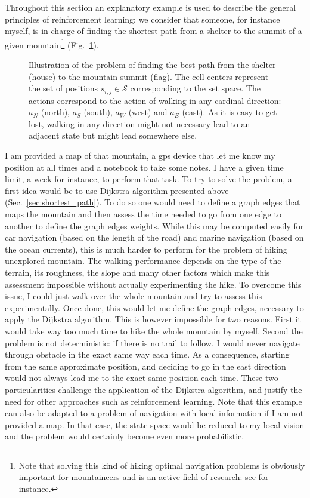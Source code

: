 Throughout this section an explanatory example is used to describe the general principles of reinforcement learning: 
we consider that someone, for instance myself, is in charge of finding the shortest path from a shelter to the summit of a given mountain\footnote{Note that solving this kind of hiking optimal navigation problems is obviously important for mountaineers and is an active field of research: see \citet{parkinson2018optimal} for instance.} (Fig.~\ref{fig:rl_mountain}).
\begin{figure}
	\centering
	\def\svgwidth{0.75\textwidth}
	
  	\caption[Illustration of the problem of finding the best path from the shelter (house) to the mountain summit (flag).]{
  		Illustration of the problem of finding the best path from the shelter (house) to the mountain summit (flag).
  		The cell centers represent the set of positions $s_{i,j} \in \mathcal{S}$ corresponding to the set space.
  		The actions correspond to the action of walking in any cardinal direction: $a_N$ (north), $a_S$ (south), $a_W$ (west) and $a_E$ (east).
  		As it is easy to get lost, walking in any direction might not necessary lead to an adjacent state but might lead somewhere else.
  	}
  	\label{fig:rl_mountain}
\end{figure}
I am provided a map of that mountain, a gps device that let me know my position at all times and a notebook to take some notes.
I have a given time limit, a week for instance, to perform that task.
To try to solve the problem, a first idea would be to use Dijkstra algorithm presented above (Sec.~\ref{sec:shortest_path}).
To do so one would need to define a graph edges that maps the mountain and then assess the time needed to go from one edge to another to define the graph edges weights.
While this may be computed easily for car navigation (based on the length of the road) and marine navigation (based on the ocean currents), this is much harder to perform for the problem of hiking unexplored mountain.
The walking performance depends on the type of the terrain, its roughness, the slope and many other factors which make this assessment impossible without actually experimenting the hike.
To overcome this issue, I could just walk over the whole mountain and try to assess this experimentally.
Once done, this would let me define the graph edges, necessary to apply the Dijkstra algorithm.
This is however impossible for two reasons.
First it would take way too much time to hike the whole mountain by myself.
Second the problem is not deterministic: if there is no trail to follow, I would never navigate through obstacle in the exact same way each time.
As a consequence, starting from the same approximate position, and deciding to go in the east direction would not always lead me to the exact same position each time.
These two particularities challenge the application of the Dijkstra algorithm, and justify the need for other approaches such as reinforcement learning.
Note that this example can also be adapted to a problem of navigation with local information if I am not provided a map.
In that case, the state space would be reduced to my local vision and the problem would certainly become even more probabilistic.

